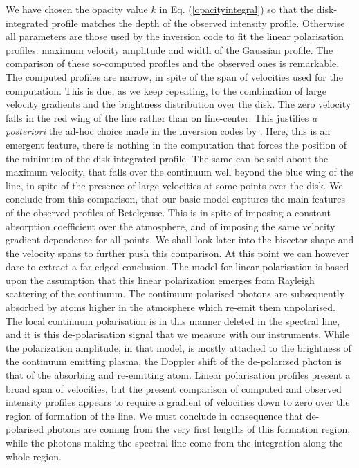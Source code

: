 \documentclass{/Users/art2/TeX/aanda/aa}
\begin{document}
We have chosen the opacity value $k$ in Eq. (\ref{opacityintegral}) so that the disk-integrated profile matches the depth of the observed 
intensity profile. Otherwise all parameters are those used by the inversion code to fit the linear polarisation profiles: maximum velocity 
amplitude and width of the Gaussian profile. The comparison of these so-computed profiles 
and the observed ones is remarkable. The computed profiles are narrow, in spite of the span of velocities used for the computation. This 
is due, as we keep repeating, to the combination of large velocity gradients and the brightness distribution over the disk. The zero velocity
falls in the red wing of the line rather than on line-center. This justifies \textit{a posteriori}  the ad-hoc choice made in the inversion 
codes by \cite{lopez_ariste_convective_2018}. Here, this is an emergent feature, there is 
nothing in the computation that forces the position of the minimum of the disk-integrated profile. The same can be said about the 
maximum velocity, that falls over the continuum well beyond the blue wing of the line, in spite of the presence of large velocities 
at some points over the disk. We conclude from this comparison, that our basic model captures the main features of the observed profiles 
of Betelgeuse. This is in spite of imposing a constant absorption coefficient over the atmosphere, and of imposing the same velocity 
gradient dependence for all points.  We shall look later into the bisector shape and the velocity spans to further push this comparison. 
At this point we can however dare to extract a far-edged conclusion. The model for linear polarisation is based upon the assumption that 
this linear polarization emerges from Rayleigh scattering of the continuum. The continuum polarised photons are subsequently absorbed 
by atoms higher in the atmosphere which re-emit them unpolarised. The local continuum polarisation is in this manner deleted in the spectral line, and it is 
this de-polarisation signal that we measure with our instruments. While the polarization amplitude, in that model, is mostly attached 
to the brightness of the continuum emitting plasma, the Doppler shift of the de-polarized photon is that of the absorbing and re-emitting atom. 
Linear polarisation profiles present a broad span  of velocities, but the present comparison of computed and observed intensity 
profiles appears to require a gradient of velocities down to zero over the region of formation of the line. We must conclude 
in consequence that de-polarised photons are coming from the very first lengths of this formation region, while the photons making 
the spectral line come from the integration along the whole region.
\end{document}
